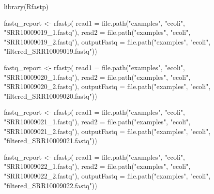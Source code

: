 \documentclass[
]{book}
\newenvironment{Shaded}{\begin{snugshade}}{\end{snugshade}}
\newcommand{\AttributeTok}[1]{\textcolor[rgb]{0.77,0.63,0.00}{#1}}
\newcommand{\FunctionTok}[1]{\textcolor[rgb]{0.00,0.00,0.00}{#1}}
\newcommand{\NormalTok}[1]{#1}
\newcommand{\OtherTok}[1]{\textcolor[rgb]{0.56,0.35,0.01}{#1}}
\newcommand{\StringTok}[1]{\textcolor[rgb]{0.31,0.60,0.02}{#1}}
\begin{document}
\begin{Shaded}
\begin{Highlighting}[]
\FunctionTok{library}\NormalTok{(Rfastp)}

\NormalTok{fastq\_report }\OtherTok{\textless{}{-}} \FunctionTok{rfastp}\NormalTok{(}
  \AttributeTok{read1 =} \FunctionTok{file.path}\NormalTok{(}\StringTok{"examples"}\NormalTok{, }\StringTok{"ecoli"}\NormalTok{, }\StringTok{"SRR10009019\_1.fastq"}\NormalTok{),}
  \AttributeTok{read2 =} \FunctionTok{file.path}\NormalTok{(}\StringTok{"examples"}\NormalTok{, }\StringTok{"ecoli"}\NormalTok{, }\StringTok{"SRR10009019\_2.fastq"}\NormalTok{), }
  \AttributeTok{outputFastq =} \FunctionTok{file.path}\NormalTok{(}\StringTok{"examples"}\NormalTok{, }\StringTok{"ecoli"}\NormalTok{, }\StringTok{"filtered\_SRR10009019.fastq"}\NormalTok{))}

\NormalTok{fastq\_report }\OtherTok{\textless{}{-}} \FunctionTok{rfastp}\NormalTok{(}
  \AttributeTok{read1 =} \FunctionTok{file.path}\NormalTok{(}\StringTok{"examples"}\NormalTok{, }\StringTok{"ecoli"}\NormalTok{, }\StringTok{"SRR10009020\_1.fastq"}\NormalTok{),}
  \AttributeTok{read2 =} \FunctionTok{file.path}\NormalTok{(}\StringTok{"examples"}\NormalTok{, }\StringTok{"ecoli"}\NormalTok{, }\StringTok{"SRR10009020\_2.fastq"}\NormalTok{), }
  \AttributeTok{outputFastq =} \FunctionTok{file.path}\NormalTok{(}\StringTok{"examples"}\NormalTok{, }\StringTok{"ecoli"}\NormalTok{, }\StringTok{"filtered\_SRR10009020.fastq"}\NormalTok{))}

\NormalTok{fastq\_report }\OtherTok{\textless{}{-}} \FunctionTok{rfastp}\NormalTok{(}
  \AttributeTok{read1 =} \FunctionTok{file.path}\NormalTok{(}\StringTok{"examples"}\NormalTok{, }\StringTok{"ecoli"}\NormalTok{, }\StringTok{"SRR10009021\_1.fastq"}\NormalTok{),}
  \AttributeTok{read2 =} \FunctionTok{file.path}\NormalTok{(}\StringTok{"examples"}\NormalTok{, }\StringTok{"ecoli"}\NormalTok{, }\StringTok{"SRR10009021\_2.fastq"}\NormalTok{), }
  \AttributeTok{outputFastq =} \FunctionTok{file.path}\NormalTok{(}\StringTok{"examples"}\NormalTok{, }\StringTok{"ecoli"}\NormalTok{, }\StringTok{"filtered\_SRR10009021.fastq"}\NormalTok{))}

\NormalTok{fastq\_report }\OtherTok{\textless{}{-}} \FunctionTok{rfastp}\NormalTok{(}
  \AttributeTok{read1 =} \FunctionTok{file.path}\NormalTok{(}\StringTok{"examples"}\NormalTok{, }\StringTok{"ecoli"}\NormalTok{, }\StringTok{"SRR10009022\_1.fastq"}\NormalTok{),}
  \AttributeTok{read2 =} \FunctionTok{file.path}\NormalTok{(}\StringTok{"examples"}\NormalTok{, }\StringTok{"ecoli"}\NormalTok{, }\StringTok{"SRR10009022\_2.fastq"}\NormalTok{), }
  \AttributeTok{outputFastq =} \FunctionTok{file.path}\NormalTok{(}\StringTok{"examples"}\NormalTok{, }\StringTok{"ecoli"}\NormalTok{, }\StringTok{"filtered\_SRR10009022.fastq"}\NormalTok{))}


\end{Highlighting}
\end{Shaded}
\end{document}
